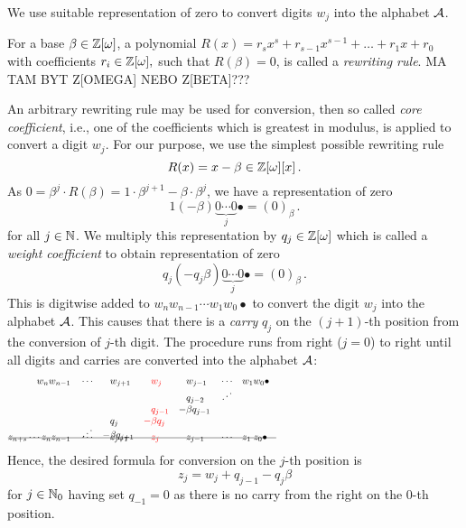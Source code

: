   We use suitable representation of zero to convert digits $w_j$ into the alphabet $\mathcal{A}$. 
  \begin{defn}
  For a base $\beta \in \mathbb{Z}[\omega]$, a polynomial $R(x)=r_s x^s+r_{s-1}x^{s-1}+ \dots + r_1 x+r_0$ with coefficients $r_i \in \mathbb{Z}[\omega],$ such that $R(\beta)=0$, is called a \emph{rewriting rule}. MA TAM BYT Z[OMEGA] NEBO Z[BETA]???
  \end{defn}  
  
  An arbitrary rewriting rule may be used for conversion, then so called \emph{core coefficient}, i.e., one of the coefficients which is greatest in modulus, is applied to convert a digit $w_j$. For our purpose, we use the simplest possible rewriting rule
  $$
    R(x)=x-\beta \in \mathbb{Z}[\omega][x]\,.
  $$
As $0=\beta^{j} \cdot R(\beta)=1\cdot \beta^{j+1} -\beta \cdot \beta^{j}$, we have a representation of zero 
$$1 (-\!\beta) \underbrace{0 \cdots 0}_{j}\bullet = (0)_\beta\,. $$
for all $j \in \mathbb{N}$. We multiply this representation by $q_j \in \mathbb{Z}[\omega]$ which is called a \emph{weight coefficient} to obtain representation of zero 
$$q_j (-q_j\beta) \underbrace{0 \cdots 0}_{j}\bullet = (0)_\beta\,. $$ 
This is digitwise added to $w_{n} w_{n-1}\cdots w_1 w_0 \bullet$ to convert the digit $w_j$ into the alphabet $\mathcal{A}$. This causes that there is a \emph{carry} $q_{j}$ on the $(j+1)$-th position from the conversion of $j$-th digit. The procedure runs from right ($j=0$) to right until all digits and carries are converted into the alphabet $\mathcal{A}$:
    \begin{align*}
        w_n w_{n-1}&&&\cdots& &w_{j+1}&\!\! &\textcolor{red}{w_j}  & \!\!  &w_{j-1} &&\cdots &&w_1 w_0\bullet \hspace{200pt}\\[-5pt]
                   &&&&       &       & &     &   &q_{j-2} &&\iddots\\[-3pt] 
                   &&&&       &       & &\textcolor{red}{q_{j-1}}& -&\beta q_{j-1} \\[-3pt]
                   &&&&         &q_j&   \textcolor{red}{-}&\textcolor{red}{\beta q_j} &&\\[-8pt]
                   &&&  \iddots      &   -&\beta q_{j+1}&   &\ &&\\[-17pt]
    \intertext{\line(1,0){280}}
    \vspace{-15pt}
    \\[-30pt]
     z_{n+s} \cdots z_{n} z_{n-1}&&&\cdots& &z_{j+1}& &\textcolor{red}{z_j}& &z_{j-1} &&\cdots &&z_1 \; z_0\bullet                            
    \end{align*}
    Hence, the desired formula for conversion on the $j$-th position is 
    \begin{equation}
        z_j=w_j + q_{j-1} - q_j \beta
    \end{equation}
    for $j \in \mathbb{N}_0$ having set $q_{-1}=0$ as there is no carry from the right on the 0-th position.
    

